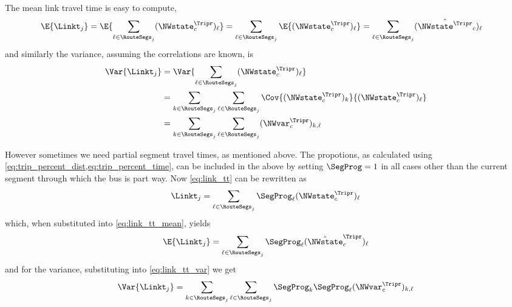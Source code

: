 The mean link travel time is easy to compute,
\begin{equation}
\label{eq:link_tt_mean}
\begin{split}
\E{\Linkt_{j}} &=
\E{\sum_{\ell\in\RouteSegs_j} (\NWstate^\Tripr_c)_\ell}
    = \sum_{\ell\in\RouteSegs_j} \E{(\NWstate^\Tripr_c)_\ell}
    = \sum_{\ell\in\RouteSegs_j} (\hat{\NWstate^\Tripr}_c)_\ell
\end{split}
\end{equation}
and similarly the variance, assuming the correlations are known, is
\begin{equation}
\label{eq:link_tt_var}
\begin{split}
\Var{\Linkt_{j}} &=
\Var{\sum_{\ell\in\RouteSegs_j} (\NWstate^\Tripr_c)_\ell} \\
    &= \sum_{k\in\RouteSegs_j} \sum_{\ell\in\RouteSegs_j}
        \Cov{(\NWstate^\Tripr_c)_k}{(\NWstate^\Tripr_c)_\ell} \\
    &= \sum_{k\in\RouteSegs_j} \sum_{\ell\in\RouteSegs_j}
        (\NWvar^\Tripr_c)_{k,\ell}
\end{split}
\end{equation}

However sometimes we need partial segment travel times,
as mentioned above.
The propotions, as calculated using
\cref{eq:trip_percent_dist,eq:trip_percent_time},
can be included in the above
by setting $\SegProg=1$ in all cases other than the current segment
through which the bus is part way.
Now \cref{eq:link_tt} can be rewritten as
\begin{equation}
\label{eq:link_tt_partial}
\Linkt_{j} =
\sum_{\ell\in\RouteSegs_j} \SegProg_\ell (\NWstate^\Tripr_c)_\ell
\end{equation}
which, when substituted into \cref{eq:link_tt_mean}, yields
\begin{equation}
\label{eq:link_tt_mean_partial}
\E{\Linkt_{j}}
    = \sum_{\ell\in\RouteSegs_j} \SegProg_\ell (\hat\NWstate^\Tripr_c)_\ell
\end{equation}
and for the variance, substituting into \cref{eq:link_tt_var} we get
\begin{equation}
\label{eq:link_tt_var}
\Var{\Linkt_{j}}
    = \sum_{k\in\RouteSegs_j} \sum_{\ell\in\RouteSegs_j}
        \SegProg_k\SegProg_\ell (\NWvar^\Tripr_c)_{k,\ell}
\end{equation}


